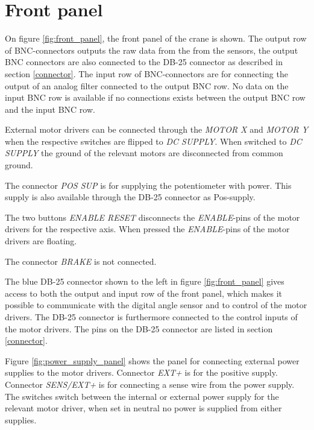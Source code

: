 \section{Front panel}
On figure \ref{fig:front_panel}, the front panel of the crane is shown. The output row of BNC-connectors outputs the raw data from the from the sensors, the output BNC connectors are also connected to the DB-25 connector as described in section \ref{connector}. The input row of BNC-connectors are for connecting the output of an analog filter connected to the output BNC row. No data on the input BNC row is available if no connections exists between the output BNC row and the input BNC row. 

External motor drivers can be connected through the \textit{MOTOR X} and \textit{MOTOR Y} when the respective switches are flipped to \textit{DC SUPPLY}. When switched to \textit{DC SUPPLY} the ground of the relevant motors are disconnected from common ground.    

The connector \textit{POS SUP} is for supplying the potentiometer with power. This supply is also available through the DB-25 connector as Pos-supply. 

The two buttons \textit{ENABLE RESET} disconnects the \textit{ENABLE}-pins of the motor drivers for the respective axis. When pressed the \textit{ENABLE}-pins of the motor drivers are floating. 

The connector \textit{BRAKE} is not connected. 

The blue DB-25 connector shown to the left in figure \ref{fig:front_panel} gives access to both the output and input row of the front panel, which makes it possible to communicate with the digital angle sensor and to control of the motor drivers. The DB-25 connector is furthermore connected to the control inputs of the motor drivers. The pins on the DB-25 connector are listed in section \ref{connector}.

Figure \ref{fig:power_supply_panel} shows the panel for connecting external power supplies to the motor drivers. Connector \textit{EXT+} is for the positive supply. Connector \textit{SENS/EXT+} is for connecting a sense wire from the power supply. The switches switch between the internal or external power supply for the relevant motor driver, when set in neutral no power is supplied from either supplies.


